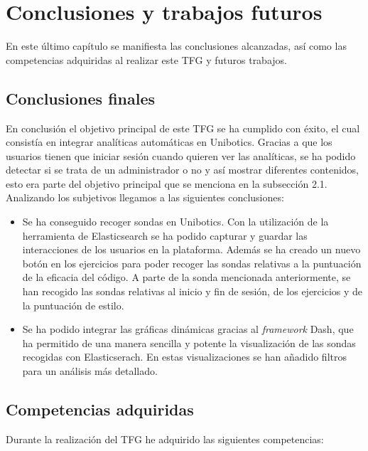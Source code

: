 \chapter{Conclusiones y trabajos futuros}\label{conclusión}

	En este último capítulo se manifiesta las conclusiones alcanzadas, así como las competencias adquiridas al realizar este TFG y futuros trabajos.
	
	\section{Conclusiones finales} 
	\label{sec:conclusiones_finales} 
En conclusión el objetivo principal de este TFG se ha cumplido con éxito, el cual consistía en integrar analíticas automáticas en Unibotics. Gracias a que los usuarios tienen que iniciar sesión cuando quieren ver las analíticas, se ha podido detectar si se trata de un administrador o no y así mostrar diferentes contenidos, esto era parte del objetivo principal que se menciona en la subsección 2.1. Analizando los subjetivos llegamos a las siguientes conclusiones:\\

\begin{itemize}
\item  Se ha conseguido recoger sondas en Unibotics. Con la utilización de la herramienta de Elasticsearch se ha podido capturar y guardar las interacciones de los usuarios en la plataforma. Además se ha creado un nuevo botón en los ejercicios para poder recoger las sondas relativas a la puntuación de la eficacia del código. A parte de la sonda mencionada anteriormente, se han recogido las sondas relativas al inicio y fin de sesión, de los ejercicios y de la puntuación de estilo.
\item Se ha podido integrar las gráficas dinámicas gracias al \textit{framework} Dash, que ha permitido de una manera sencilla y potente la visualización de las sondas recogidas con Elasticserach. En estas visualizaciones se han añadido filtros para un análisis más detallado.
\end{itemize}

	\section{Competencias adquiridas} 
	\label{sec:competencias_adquiridas} 
	Durante la realización del TFG he adquirido las siguientes competencias:
		
